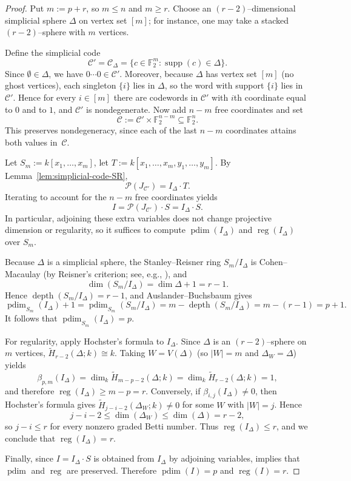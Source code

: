 \documentclass[12pt]{amsart}
\theoremstyle{remark}
\theoremstyle{definition}
\DeclareMathOperator{\reg}{reg}
\DeclareMathOperator{\depth}{depth}
\DeclareMathOperator{\pd}{pdim}
\DeclareMathOperator{\supp}{supp}
\newcommand{\F}{\mathbb{F}}
\newcommand{\C}{\mathcal{C}}
\def\P{{\mathcal P}}
\begin{document}
\begin{proof}
Put $m:=p+r$, so $m\le n$ and $m\ge r$. Choose an $(r-2)$--dimensional simplicial sphere $\Delta$ on
vertex set $[m]$; for instance, one may take a stacked $(r-2)$--sphere with $m$ vertices.

Define the simplicial code
\[
\C'=\C_\Delta=\{c\in \F_2^m : \supp(c)\in \Delta\}.
\]
Since $\emptyset\in\Delta$, we have $0\cdots 0\in \C'$. Moreover, because $\Delta$ has vertex set $[m]$
(no ghost vertices), each singleton $\{i\}$ lies in $\Delta$, so the word with support $\{i\}$ lies in $\C'$.
Hence for every $i\in[m]$ there are codewords in $\C'$ with $i$th coordinate equal to $0$ and to $1$, and
$\C'$ is nondegenerate. Now add $n-m$ free coordinates and set
\[
\C  :=  \C'\times \F_2^{ n-m} \subseteq \F_2^n.
\]
This preserves nondegeneracy, since each of the last $n-m$ coordinates attains both values in~$\C$.

Let $S_m:=k[x_1,\dots,x_m]$, let $T:=k[x_1,\dots,x_m,y_1,\dots,y_m]$. By Lemma~\ref{lem:simplicial-code-SR},
\[
\P(J_{\C'})=I_\Delta\cdot T.
\]
Iterating  to account for the $n-m$ free coordinates yields
\[
I=\P(J_{\C'})\cdot S = I_\Delta\cdot S.
\]
In particular, adjoining these extra variables does not change projective dimension or regularity, so it
suffices to compute $\pd(I_\Delta)$ and $\reg(I_\Delta)$ over $S_m$.

Because $\Delta$ is a simplicial sphere, the Stanley--Reisner ring $S_m/I_\Delta$ is Cohen--Macaulay
(by Reisner's criterion; see, e.g., \cite[Theorem~5.1.9]{miller}), and
\[
\dim(S_m/I_\Delta)=\dim\Delta+1=r-1.
\]
Hence $\depth(S_m/I_\Delta)=r-1$, and Auslander--Buchsbaum gives
\[
\pd_{S_m}(I_\Delta)+1= \pd_{S_m}(S_m/I_\Delta)=m-\depth(S_m/I_\Delta)=m-(r-1)=p+1.
\]
It follows that $\pd_{S_m}(I_\Delta)=p$.


For regularity, apply Hochster’s formula to $I_\Delta$. Since $\Delta$ is an $(r-2)$--sphere on $m$ vertices,
$\widetilde H_{r-2}(\Delta;k)\cong k$. Taking $W=V(\Delta)$ (so $|W|=m$ and $\Delta_W=\Delta$) yields
\[
\beta_{p,m}(I_\Delta)
=\dim_k \widetilde H_{m-p-2}(\Delta;k)
=\dim_k \widetilde H_{r-2}(\Delta;k)
=1,
\]
and therefore $\reg(I_\Delta)\ge m-p=r$.
Conversely, if $\beta_{i,j}(I_\Delta)\neq 0$, then Hochster’s formula gives
$\widetilde H_{j-i-2}(\Delta_W;k)\neq 0$ for some $W$ with $|W|=j$. Hence
\[
j-i-2 \le \dim(\Delta_W)\le \dim(\Delta)=r-2,
\]
so $j-i\le r$ for every nonzero graded Betti number. Thus $\reg(I_\Delta)\le r$, and we conclude that
$\reg(I_\Delta)=r$.

Finally, since $I=I_\Delta\cdot S$ is obtained from $I_\Delta$ by adjoining variables, 
implies that $\pd$ and $\reg$ are preserved. Therefore $\pd(I)=p$ and $\reg(I)=r$.
\end{proof}
\end{document}
